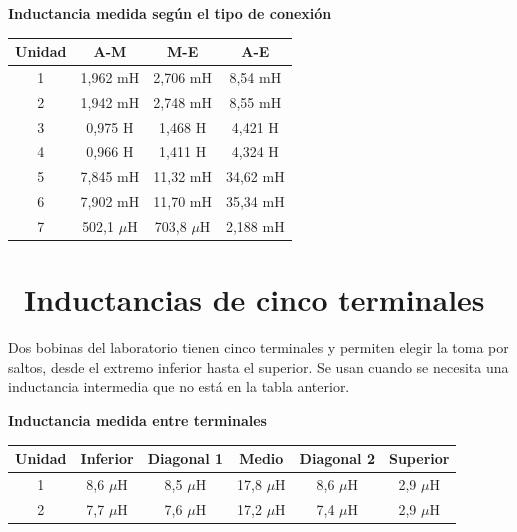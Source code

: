 \documentclass[11pt,a4paper]{article}
\newcommand{\iconotexto}[2]{\textcolor{cyanNeon}{\faIcon{#1}}~#2}
\begin{document}
\begin{center}
\begin{minipage}{\linewidth}
\centering
{\small
\textbf{Inductancia medida según el tipo de conexión}\par\smallskip
\begin{tabular}{@{}cccc@{}}
\toprule
Unidad & A-M & M-E & A-E \\
\midrule
1 & 1,962 mH & 2,706 mH & 8,54 mH \\
2 & 1,942 mH & 2,748 mH & 8,55 mH \\
3 & 0,975 H & 1,468 H & 4,421 H \\
4 & 0,966 H & 1,411 H & 4,324 H \\
5 & 7,845 mH & 11,32 mH & 34,62 mH \\
6 & 7,902 mH & 11,70 mH & 35,34 mH \\
7 & 502,1 $\mu$H & 703,8 $\mu$H & 2,188 mH \\
\bottomrule
\end{tabular}
}\par{}
\end{minipage}
\end{center}

\section{\iconotexto{paperclip}{Inductancias de cinco terminales}}

Dos bobinas del laboratorio tienen cinco terminales y permiten elegir la toma por saltos, desde el extremo inferior hasta el superior. Se usan cuando se necesita una inductancia intermedia que no está en la tabla anterior.

\begin{center}
\begin{minipage}{\linewidth}
\centering
{\small
\textbf{Inductancia medida entre terminales}\par\smallskip
\begin{tabular}{@{}cccccc@{}}
\toprule
Unidad & Inferior & Diagonal 1 & Medio & Diagonal 2 & Superior \\
\midrule
1 & 8,6 $\mu$H & 8,5 $\mu$H & 17,8 $\mu$H & 8,6 $\mu$H & 2,9 $\mu$H \\
2 & 7,7 $\mu$H & 7,6 $\mu$H & 17,2 $\mu$H & 7,4 $\mu$H & 2,9 $\mu$H \\
\bottomrule
\end{tabular}
}\par{}
\end{minipage}
\end{center}
\end{document}
